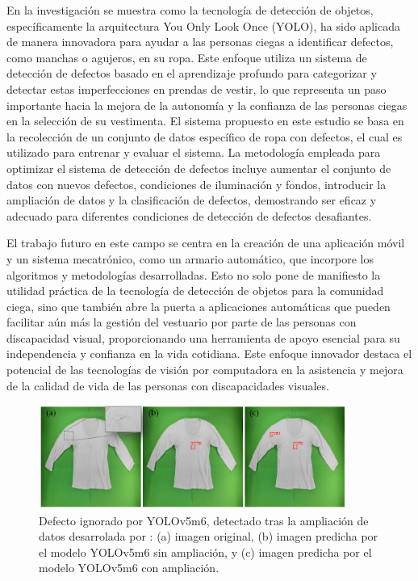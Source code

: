 En la investigación \cite{Rocha2023} se muestra como la tecnología de detección de objetos, específicamente la arquitectura You Only Look Once (YOLO), ha sido aplicada de manera innovadora para ayudar a las personas ciegas a identificar defectos, como manchas o agujeros, en su ropa. Este enfoque utiliza un sistema de detección de defectos basado en el aprendizaje profundo para categorizar y detectar estas imperfecciones en prendas de vestir, lo que representa un paso importante hacia la mejora de la autonomía y la confianza de las personas ciegas en la selección de su vestimenta. El sistema propuesto en este estudio se basa en la recolección de un conjunto de datos específico de ropa con defectos, el cual es utilizado para entrenar y evaluar el sistema. La metodología empleada para optimizar el sistema de detección de defectos incluye aumentar el conjunto de datos con nuevos defectos, condiciones de iluminación y fondos, introducir la ampliación de datos y la clasificación de defectos, demostrando ser eficaz y adecuado para diferentes condiciones de detección de defectos desafiantes.

El trabajo futuro en este campo se centra en la creación de una aplicación móvil y un sistema mecatrónico, como un armario automático, que incorpore los algoritmos y metodologías desarrolladas. Esto no solo pone de manifiesto la utilidad práctica de la tecnología de detección de objetos para la comunidad ciega, sino que también abre la puerta a aplicaciones automáticas que pueden facilitar aún más la gestión del vestuario por parte de las personas con discapacidad visual, proporcionando una herramienta de apoyo esencial para su independencia y confianza en la vida cotidiana. Este enfoque innovador destaca el potencial de las tecnologías de visión por computadora en la asistencia y mejora de la calidad de vida de las personas con discapacidades visuales.

\begin{figure}[H]
	\centering
	\includegraphics[width=0.9\textwidth]{img/example_YOLO.pdf}
	\caption[Defecto ignorado por YOLOv5m6, detectado tras la ampliación de datos.]{Defecto ignorado por YOLOv5m6, detectado tras la ampliación de datos desarrolada por \cite{Rocha2023}: (a) imagen original, (b) imagen predicha por el modelo YOLOv5m6 sin ampliación, y (c) imagen predicha por el modelo YOLOv5m6 con ampliación.}
	\label{fig:example_YOLO}
\end{figure}

